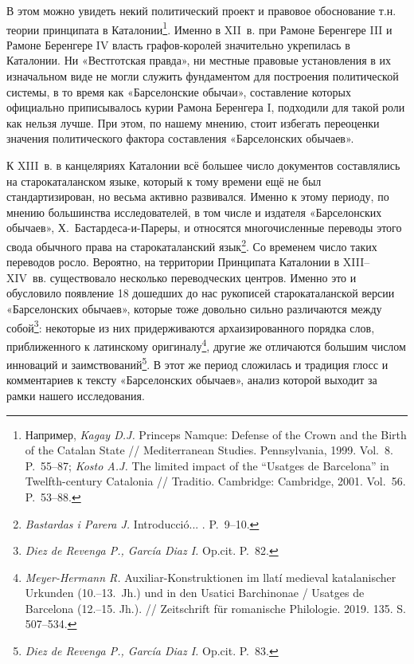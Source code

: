 В этом можно увидеть некий политический проект и правовое обоснование т.н. теории принципата в Каталонии\footnote{Например, \emph{Kagay D.J. }Princeps Namque: Defense of the Crown and the Birth of the Catalan State // Mediterranean Studies. Pennsylvania, 1999. Vol.~8. P.~55--87; \emph{Kosto A.J. }The limited impact of the “Usatges de Barcelona” in Twelfth-century Catalonia // Traditio. Cambridge: Cambridge, 2001. Vol.~56. P.~53--88.}. Именно в XII~в. при Рамоне Беренгере III и Рамоне Беренгере IV власть графов-королей значительно укрепилась в Каталонии. Ни «Вестготская правда», ни местные правовые установления в их изначальном виде не могли служить фундаментом для построения политической системы, в то время как «Барселонские обычаи», составление которых официально приписывалось курии Рамона Беренгера I, подходили для такой роли как нельзя лучше. При этом, по нашему мнению, стоит избегать переоценки значения политического фактора составления «Барселонских обычаев».

К XIII~в. в канцеляриях Каталонии всё большее число документов составлялись на старокаталанском языке, который к тому времени ещё не был стандартизирован, но весьма активно развивался. Именно к этому периоду, по мнению большинства исследователей, в том числе и издателя «Барселонских обычаев», Х.~Бастардеса-и-Пареры, и относятся многочисленные переводы этого свода обычного права на старокаталанский язык\footnote{\emph{Bastardas i Parera J.} Introducció... . P.~9--10.}. Со временем число таких переводов росло. Вероятно, на территории Принципата Каталонии в XIII--XIV~вв. существовало несколько переводческих центров. Именно это и обусловило появление 18 дошедших до нас рукописей старокаталанской версии «Барселонских обычаев», которые тоже довольно сильно различаются между собой\footnote{\emph{Diez de Revenga P., García Diaz I. }Op.cit. P.~82.}: некоторые из них придерживаются архаизированного порядка слов, приближенного к латинскому оригиналу\footnote{\emph{Meyer-Hermann R.} Auxiliar-Konstruktionen im llatí medieval katalanischer Urkunden (10.--13.~Jh.) und in den Usatici Barchinonae / Usatges de Barcelona (12.--15. Jh.). // Zeitschrift für romanische Philologie. 2019. 135. S. 507--534.}, другие же отличаются большим числом инноваций и заимствований\footnote{\emph{Diez de Revenga P., García Diaz I.} Op.cit. P.~83.}. В этот же период сложилась и традиция глосс и комментариев к тексту «Барселонских обычаев», анализ которой выходит за рамки нашего исследования.

